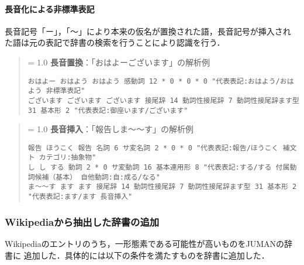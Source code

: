 \documentclass[a4j,titlepage]{jarticle}
\begin{document}
\paragraph{長音化による非標準表記}
長音記号「ー」，「〜」により本来の仮名が置換された語，長音記号が挿入され
た語は元の表記で辞書の検索を行うことにより認識を行う．

\noindent
\begin{quote}
{\baselineskip = 1.0 \baselineskip
{\bf 長音置換}：「おはよーございます」の解析例\vspace{-2ex}
\begin{verbatim}
おはよー おはよう おはよう 感動詞 12 * 0 * 0 * 0 "代表表記:おはよう/おはよう 非標準表記"
ございます ございます ございます 接尾辞 14 動詞性接尾辞 7 動詞性接尾辞ます型 31 基本形 2 "代表表記:御座います/ございます"
\end{verbatim}
}
\end{quote}

\noindent
\begin{quote}
{\baselineskip = 1.0 \baselineskip
{\bf 長音挿入}：「報告しま〜〜す」の解析例\vspace{-2ex}
\begin{verbatim}
報告 ほうこく 報告 名詞 6 サ変名詞 2 * 0 * 0 "代表表記:報告/ほうこく 補文ト カテゴリ:抽象物"
し し する 動詞 2 * 0 サ変動詞 16 基本連用形 8 "代表表記:する/する 付属動詞候補（基本） 自他動詞:自:成る/なる"
ま〜〜す ます ます 接尾辞 14 動詞性接尾辞 7 動詞性接尾辞ます型 31 基本形 2 "代表表記:ます/ます 長音挿入"
\end{verbatim}
}
\end{quote}

\subsubsection{Wikipediaから抽出した辞書の追加}

Wikipediaのエントリのうち，一形態素である可能性が高いものをJUMANの辞書に
追加した．具体的には以下の条件を満たすものを辞書に追加した．
\end{document}
